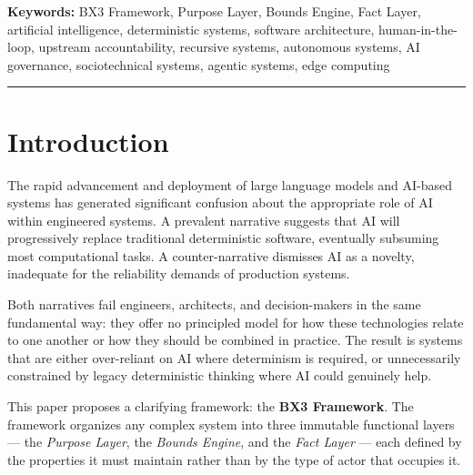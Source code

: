 \documentclass[12pt]{article}
\begin{document}
\begin{abstract}
\vspace{0.5em}
\noindent\textit{This paper is a conceptual framework and position paper. Empirical validation studies are currently in development by the author and will be published as subsequent work. This preprint establishes the theoretical foundation and research agenda that those studies will address.}
\end{abstract}

\vspace{0.5em}
\noindent\textbf{Keywords:} BX3 Framework, Purpose Layer, Bounds Engine, Fact Layer, artificial intelligence, deterministic systems, software architecture, human-in-the-loop, upstream accountability, recursive systems, autonomous systems, AI governance, sociotechnical systems, agentic systems, edge computing

\vspace{1em}
\hrule
\vspace{1em}

\onehalfspacing

\section{Introduction}
\label{sec:intro}

The rapid advancement and deployment of large language models and AI-based systems has generated significant confusion about the appropriate role of AI within engineered systems. A prevalent narrative suggests that AI will progressively replace traditional deterministic software, eventually subsuming most computational tasks. A counter-narrative dismisses AI as a novelty, inadequate for the reliability demands of production systems.

Both narratives fail engineers, architects, and decision-makers in the same fundamental way: they offer no principled model for how these technologies relate to one another or how they should be combined in practice. The result is systems that are either over-reliant on AI where determinism is required, or unnecessarily constrained by legacy deterministic thinking where AI could genuinely help.

This paper proposes a clarifying framework: the \textbf{BX3 Framework}. The framework organizes any complex system into three immutable functional layers --- the \textit{Purpose Layer}, the \textit{Bounds Engine}, and the \textit{Fact Layer} --- each defined by the properties it must maintain rather than by the type of actor that occupies it.
\end{document}
